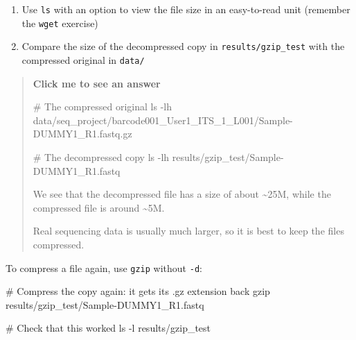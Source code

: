 \documentclass[
  letterpaper,
  DIV=11,
  numbers=noendperiod]{scrreprt}
\newenvironment{Shaded}{}{}
\newcommand{\AttributeTok}[1]{\textcolor[rgb]{0.84,0.23,0.29}{#1}}
\newcommand{\CommentTok}[1]{\textcolor[rgb]{0.42,0.45,0.49}{#1}}
\newcommand{\FunctionTok}[1]{\textcolor[rgb]{0.44,0.26,0.76}{#1}}
\newcommand{\NormalTok}[1]{\textcolor[rgb]{0.14,0.16,0.18}{#1}}
\providecommand{\tightlist}{%
  \setlength{\itemsep}{0pt}\setlength{\parskip}{0pt}}
\begin{document}
\begin{tcolorbox}[enhanced jigsaw, coltitle=black, breakable, titlerule=0mm, colback=white, rightrule=.15mm, bottomrule=.15mm, toprule=.15mm, colframe=quarto-callout-color-frame, colbacktitle=quarto-callout-color!10!white, bottomtitle=1mm, opacitybacktitle=0.6, toptitle=1mm, leftrule=.75mm, arc=.35mm, title=\textcolor{quarto-callout-color}{\faInfo}\hspace{0.5em}{Exercise}, left=2mm, opacityback=0]

\begin{enumerate}
\def\labelenumi{\arabic{enumi}.}
\tightlist
\item
  Use \texttt{ls} with an option to view the file size in an
  easy-to-read unit (remember the \texttt{wget} exercise)
\item
  Compare the size of the decompressed copy in
  \texttt{results/gzip\_test} with the compressed original in
  \texttt{data/}
\end{enumerate}

\begin{quote}
\textbf{Click me to see an answer}

\begin{Shaded}
\begin{Highlighting}[]
\CommentTok{\# The compressed original}
\FunctionTok{ls} \AttributeTok{{-}lh}\NormalTok{ data/seq\_project/barcode001\_User1\_ITS\_1\_L001/Sample{-}DUMMY1\_R1.fastq.gz}

\CommentTok{\# The decompressed copy}
\FunctionTok{ls} \AttributeTok{{-}lh}\NormalTok{ results/gzip\_test/Sample{-}DUMMY1\_R1.fastq}
\end{Highlighting}
\end{Shaded}

We see that the decompressed file has a size of about
\textasciitilde25M, while the compressed file is around
\textasciitilde5M.

Real sequencing data is usually much larger, so it is best to keep the
files compressed.
\end{quote}

\end{tcolorbox}

To compress a file again, use \texttt{gzip} without \texttt{-d}:

\begin{Shaded}
\begin{Highlighting}[]
\CommentTok{\# Compress the copy again: it gets its .gz extension back}
\FunctionTok{gzip}\NormalTok{ results/gzip\_test/Sample{-}DUMMY1\_R1.fastq}

\CommentTok{\# Check that this worked}
\FunctionTok{ls} \AttributeTok{{-}l}\NormalTok{ results/gzip\_test}
\end{Highlighting}
\end{Shaded}
\end{document}
